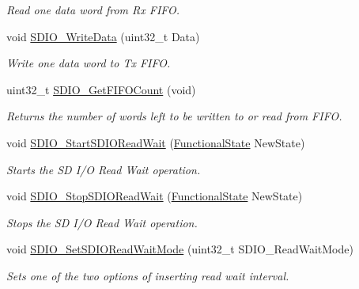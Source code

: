 \begin{DoxyCompactItemize}
\begin{DoxyCompactList}\small\item\em Read one data word from Rx F\+I\+FO. \end{DoxyCompactList}\item 
void \hyperlink{group___s_d_i_o___exported___functions_ga361008b5252aa33b5f2b5823ee3d7240}{S\+D\+I\+O\+\_\+\+Write\+Data} (uint32\+\_\+t Data)
\begin{DoxyCompactList}\small\item\em Write one data word to Tx F\+I\+FO. \end{DoxyCompactList}\item 
uint32\+\_\+t \hyperlink{group___s_d_i_o___exported___functions_ga9a3343983a2d68b5164a1c89797d2dd6}{S\+D\+I\+O\+\_\+\+Get\+F\+I\+F\+O\+Count} (void)
\begin{DoxyCompactList}\small\item\em Returns the number of words left to be written to or read from F\+I\+FO. \end{DoxyCompactList}\item 
void \hyperlink{group___s_d_i_o___exported___functions_gac88f914d9a68a83abc2265ec8a7b79fc}{S\+D\+I\+O\+\_\+\+Start\+S\+D\+I\+O\+Read\+Wait} (\hyperlink{group___exported__types_gac9a7e9a35d2513ec15c3b537aaa4fba1}{Functional\+State} New\+State)
\begin{DoxyCompactList}\small\item\em Starts the SD I/O Read Wait operation. \end{DoxyCompactList}\item 
void \hyperlink{group___s_d_i_o___exported___functions_gaca6b25eb2debb73ac827c66f0ebcf837}{S\+D\+I\+O\+\_\+\+Stop\+S\+D\+I\+O\+Read\+Wait} (\hyperlink{group___exported__types_gac9a7e9a35d2513ec15c3b537aaa4fba1}{Functional\+State} New\+State)
\begin{DoxyCompactList}\small\item\em Stops the SD I/O Read Wait operation. \end{DoxyCompactList}\item 
void \hyperlink{group___s_d_i_o___exported___functions_ga2baac4ea1bb6c2d94345d2712604338a}{S\+D\+I\+O\+\_\+\+Set\+S\+D\+I\+O\+Read\+Wait\+Mode} (uint32\+\_\+t S\+D\+I\+O\+\_\+\+Read\+Wait\+Mode)
\begin{DoxyCompactList}\small\item\em Sets one of the two options of inserting read wait interval. \end{DoxyCompactList}\item 

\end{DoxyCompactItemize}
